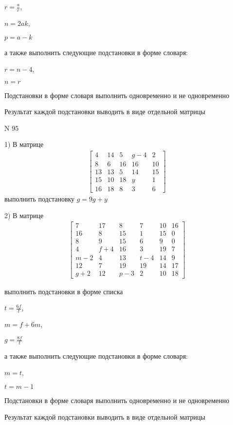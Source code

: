 \documentclass[11pt]{report}
\begin{document}
$r=\frac{a}{r}$,

$n=2 a k$,

$p=a - k$

а также выполнить следующие подстановки в форме словаря:

$r=n - 4$,

$n=r$


    Подстановки в форме словаря выполнить одновременно и не одновременно


    Результат каждой подстановки выводить в виде отдельной матрицы

\newpage
N 95


    1) В матрице
\begin{align*}
\left[\begin{matrix}4 & 14 & 5 & g - 4 & 2\\8 & 6 & 16 & 16 & 10\\13 & 13 & 5 & 14 & 15\\15 & 10 & 18 & y & 1\\16 & 18 & 8 & 3 & 6\end{matrix}\right]
\end{align*}
выполнить подстановку $g=9 g + y$


    2) В матрице
\begin{align*}
\left[\begin{matrix}7 & 17 & 8 & 7 & 10 & 16\\16 & 8 & 15 & 1 & 15 & 0\\8 & 9 & 15 & 6 & 9 & 0\\4 & f + 4 & 16 & 3 & 19 & 7\\m - 2 & 4 & 13 & t - 4 & 14 & 9\\12 & 7 & 19 & 19 & 14 & 17\\g + 2 & 12 & p - 3 & 2 & 10 & 18\end{matrix}\right]
\end{align*}

выполнить подстановки в форме списка

$t=\frac{6 f}{t}$,

$m=f + 6 m$,

$g=\frac{8 f}{t}$

а также выполнить следующие подстановки в форме словаря:

$m=t$,

$t=m - 1$


    Подстановки в форме словаря выполнить одновременно и не одновременно


    Результат каждой подстановки выводить в виде отдельной матрицы
\end{document}
